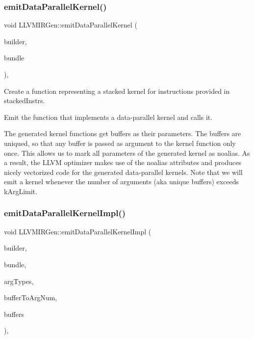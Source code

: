 \subsubsection{\texorpdfstring{emit\+Data\+Parallel\+Kernel()}{emitDataParallelKernel()}}
{\footnotesize\ttfamily void L\+L\+V\+M\+I\+R\+Gen\+::emit\+Data\+Parallel\+Kernel (\begin{DoxyParamCaption}\item[{llvm\+::\+I\+R\+Builder$<$$>$ \&}]{builder,  }\item[{llvm\+::\+Array\+Ref$<$ const \hyperlink{classglow_1_1_instruction}{Instruction} $\ast$$>$}]{bundle }\end{DoxyParamCaption})\hspace{0.3cm}{\ttfamily [protected]}, {\ttfamily [virtual]}}

Create a function representing a stacked kernel for instructions provided in {\ttfamily stacked\+Instrs}.

Emit the function that implements a data-\/parallel kernel and calls it.

The generated kernel functions get buffers as their parameters. The buffers are uniqued, so that any buffer is passed as argument to the kernel function only once. This allows us to mark all parameters of the generated kernel as noalias. As a result, the L\+L\+VM optimizer makes use of the noalias attributes and produces nicely vectorized code for the generated data-\/parallel kernels. Note that we will emit a kernel whenever the number of arguments (aka unique buffers) exceeds {\ttfamily k\+Arg\+Limit}. \mbox{\label{classglow_1_1_l_l_v_m_i_r_gen_a8f1f6b6418b0be48fbd933fe48491c2d}} 
\subsubsection{\texorpdfstring{emit\+Data\+Parallel\+Kernel\+Impl()}{emitDataParallelKernelImpl()}}
{\footnotesize\ttfamily void L\+L\+V\+M\+I\+R\+Gen\+::emit\+Data\+Parallel\+Kernel\+Impl (\begin{DoxyParamCaption}\item[{llvm\+::\+I\+R\+Builder$<$$>$ \&}]{builder,  }\item[{llvm\+::\+Array\+Ref$<$ const \hyperlink{classglow_1_1_instruction}{Instruction} $\ast$$>$}]{bundle,  }\item[{llvm\+::\+Array\+Ref$<$ llvm\+::\+Type $\ast$$>$}]{arg\+Types,  }\item[{llvm\+::\+Dense\+Map$<$ \hyperlink{classglow_1_1_value}{Value} $\ast$, int $>$ \&}]{buffer\+To\+Arg\+Num,  }\item[{llvm\+::\+Array\+Ref$<$ llvm\+::\+Value $\ast$$>$}]{buffers }\end{DoxyParamCaption})\hspace{0.3cm}{\ttfamily [protected]}, {\ttfamily [virtual]}}

